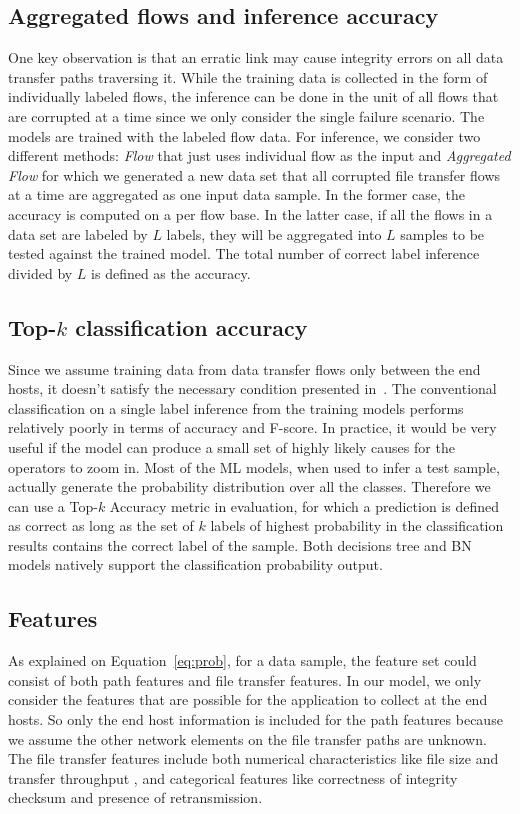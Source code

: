 \subsection{Aggregated flows and inference accuracy}
One key observation is that an erratic link may cause integrity errors on all data transfer paths traversing it. While the training data is collected in the form of individually labeled flows, the inference can be done in the unit of all flows that are corrupted at a time since we only consider the single failure scenario. The models are trained with the labeled flow data.  For inference, we consider two different methods: {\it Flow} that just uses individual flow as the input and {\it Aggregated Flow} for which we generated a new data set that all corrupted file transfer flows at a time are aggregated as one input data sample. In the former case, the accuracy is computed on a per flow base. In the latter case, if all the flows in a data set are labeled by $L$ labels, they will be aggregated into $L$ samples to be tested against the trained model. The total number of correct label inference divided by $L$ is defined as the accuracy.

\subsection{Top-$k$ classification accuracy} 
Since we assume training data from data transfer flows only between the end hosts, it doesn't satisfy the necessary condition presented in~\cite{netbouncer:nsdi18}. The conventional classification on a single label inference from the training models performs relatively poorly in terms of accuracy and F-score. In practice, it would be very useful if the model can produce a small set of highly likely causes for the operators to zoom in. Most of the ML models, when used to infer a test sample, actually generate the probability distribution over all the classes. Therefore we can use a Top-$k$ Accuracy metric in evaluation, for which a prediction is defined as correct as long as the set of $k$ labels of highest probability in the classification results contains the correct label of the sample. Both decisions tree and BN models natively support the classification probability output. 

\subsection{Features}
As explained on Equation~\ref{eq:prob}, for a data sample, the feature set could consist of both path features and file transfer features. In our model, we only consider the features that are possible for the application to collect at the end hosts.
So only the end host information is included for the path features because we assume the other network elements on the file transfer paths are unknown. 
The file transfer features include both numerical characteristics like file size and transfer throughput , and categorical features like correctness of integrity checksum and presence of retransmission. 

